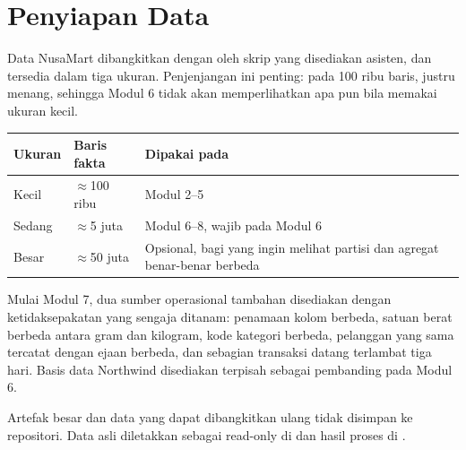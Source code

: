 \section{Penyiapan Data}

Data NusaMart dibangkitkan dengan  oleh skrip yang disediakan
asisten, dan tersedia dalam tiga ukuran. Penjenjangan ini penting: pada 100 ribu
baris,  justru menang, sehingga Modul 6 tidak akan
memperlihatkan apa pun bila memakai ukuran kecil.

\begin{center}
\small
\begin{tabular}{@{}p{}p{}p{}@{}}
\toprule
\textbf{Ukuran} & \textbf{Baris fakta} & \textbf{Dipakai pada} \\
\midrule
Kecil  & $\approx$100 ribu & Modul 2--5 \\
Sedang & $\approx$5 juta   & Modul 6--8, wajib pada Modul 6 \\
Besar  & $\approx$50 juta  & Opsional, bagi yang ingin melihat partisi dan
                             agregat benar-benar berbeda \\
\bottomrule
\end{tabular}
\end{center}

Mulai Modul 7, dua sumber operasional tambahan disediakan dengan
ketidaksepakatan yang sengaja ditanam: penamaan kolom berbeda, satuan berat
berbeda antara gram dan kilogram, kode kategori berbeda, pelanggan yang sama
tercatat dengan ejaan berbeda, dan sebagian transaksi datang terlambat tiga
hari. Basis data Northwind disediakan terpisah sebagai pembanding pada Modul 6.

Artefak besar dan data yang dapat dibangkitkan ulang tidak disimpan ke
repositori. Data asli diletakkan sebagai read-only di  dan
hasil proses di .
